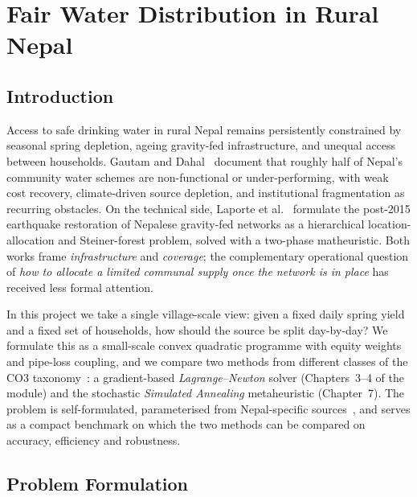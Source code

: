 \chapter{Fair Water Distribution in Rural Nepal}
\label{chap:report}

\section{Introduction}
Access to safe drinking water in rural Nepal remains persistently
constrained by seasonal spring depletion, ageing gravity-fed
infrastructure, and unequal access between households.
Gautam and Dahal~\cite{gautam2020} document that roughly half of Nepal's
community water schemes are non-functional or under-performing,
with weak cost recovery, climate-driven source depletion, and
institutional fragmentation as recurring obstacles. On the
technical side, Laporte et al.~\cite{laporte2022} formulate the post-2015
earthquake restoration of Nepalese gravity-fed networks as a
hierarchical location-allocation and Steiner-forest problem,
solved with a two-phase matheuristic. Both works frame
\emph{infrastructure} and \emph{coverage}; the complementary
operational question of \emph{how to allocate a limited communal
supply once the network is in place} has received less formal
attention.

In this project we take a single village-scale view: given a
fixed daily spring yield and a fixed set of households, how
should the source be split day-by-day? We formulate this as a
small-scale convex quadratic programme with equity weights and
pipe-loss coupling, and we compare two methods from different
classes of the CO3 taxonomy~\citep{ottCO3slides}: a gradient-based
\emph{Lagrange--Newton} solver (Chapters~3--4 of the module) and
the stochastic \emph{Simulated Annealing} metaheuristic
(Chapter~7). The problem is self-formulated, parameterised from
Nepal-specific sources~\citep{nepalDWSS,whoJMP}, and serves as a
compact benchmark on which the two methods can be compared on
accuracy, efficiency and robustness.

\section{Problem Formulation}
\label{sec:formulation}

